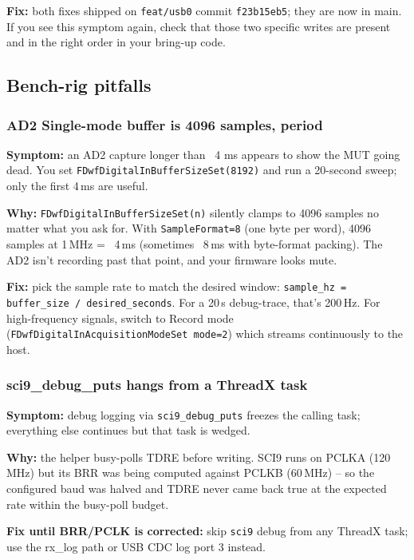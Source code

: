 \textbf{Fix:} both fixes shipped on \texttt{feat/usb0} commit
\texttt{f23b15eb5}; they are now in main. If you see this symptom
again, check that those two specific writes are present and in
the right order in your bring-up code.

\subsection{Bench-rig pitfalls}

\subsubsection{AD2 Single-mode buffer is 4096 samples, period}

\textbf{Symptom:} an AD2 capture longer than ~4 ms appears to show
the MUT going dead. You set
\texttt{FDwfDigitalInBufferSizeSet(8192)} and run a 20-second
sweep; only the first 4\,ms are useful.

\textbf{Why:} \texttt{FDwfDigitalInBufferSizeSet(n)} silently
clamps to 4096 samples no matter what you ask for. With
\texttt{SampleFormat=8} (one byte per word), 4096 samples at
1\,MHz = ~4\,ms (sometimes ~8\,ms with byte-format packing). The
AD2 isn't recording past that point, and your firmware looks
mute.

\textbf{Fix:} pick the sample rate to match the desired window:
\texttt{sample\_hz = buffer\_size / desired\_seconds}. For a 20\,s
debug-trace, that's 200\,Hz. For high-frequency signals, switch to
Record mode (\texttt{FDwfDigitalInAcquisitionModeSet mode=2}) which
streams continuously to the host.

\subsubsection{sci9\_debug\_puts hangs from a ThreadX task}

\textbf{Symptom:} debug logging via \texttt{sci9\_debug\_puts}
freezes the calling task; everything else continues but that task
is wedged.

\textbf{Why:} the helper busy-polls TDRE before writing. SCI9 runs
on PCLKA (120\,MHz) but its BRR was being computed against PCLKB
(60\,MHz) -- so the configured baud was halved and TDRE never
came back true at the expected rate within the busy-poll budget.

\textbf{Fix until BRR/PCLK is corrected:} skip \texttt{sci9}
debug from any ThreadX task; use the rx\_log path or USB CDC log
port 3 instead.

